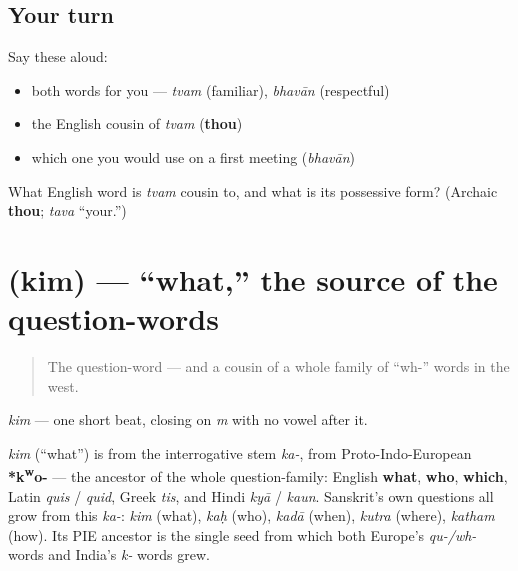 \subsection*{Your turn}
Say these aloud:

\begin{itemize}
\raggedright
  \item both words for you — \emph{tvam} (familiar), \emph{bhavān} (respectful)
  \item the English cousin of \emph{tvam} (\textbf{thou})
  \item which one you would use on a first meeting (\emph{bhavān})
\end{itemize}

\begin{tcolorbox}[breakable,colback=teal!4,colframe=teal!35!black,title={Before you move on}]
What English word is \emph{tvam} cousin to, and what is its possessive form? (Archaic \textbf{thou}; \emph{tava} \textquotedblleft{}your.\textquotedblright{})
\end{tcolorbox}
\section[\texorpdfstring{\sk{किम्} (kim)}{किम् (kim)}]{ (kim) — \textquotedblleft{}what,\textquotedblright{} the source of the question-words}

\label{lesson:SA-C02-kim}



\begin{quote}
The question-word — and a cousin of a whole family of \textquotedblleft{}wh-\textquotedblright{} words in the west.
\end{quote}

\begin{sounds}
\emph{kim} — one short beat, closing on \emph{m} with no vowel after it.
\end{sounds}

\begin{cousinweb}
\emph{kim} (\textquotedblleft{}what\textquotedblright{}) is from the interrogative stem \emph{ka-}, from Proto-Indo-European \textbf{*k\textsuperscript{w}o-} — the ancestor of the whole question-family: English \textbf{what}, \textbf{who}, \textbf{which}, Latin \emph{quis} / \emph{quid}, Greek \emph{tis}, and Hindi \emph{kyā} / \emph{kaun}. Sanskrit's own questions all grow from this \emph{ka-}: \emph{kim} (what), \emph{kaḥ} (who), \emph{kadā} (when), \emph{kutra} (where), \emph{katham} (how). Its PIE ancestor is the single seed from which both Europe's \emph{qu-/wh-} words and India's \emph{k-} words grew.
\end{cousinweb}

